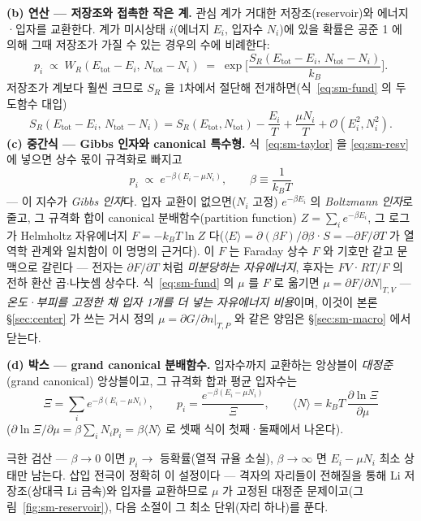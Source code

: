 \textbf{(b) 연산 --- 저장조와 접촉한 작은 계.} 관심 계가 거대한 저장조(reservoir)와 에너지·입자를 교환한다.
계가 미시상태 $i$(에너지 $E_i$, 입자수 $N_i$)에 있을 확률은 공준 1 에 의해 그때 저장조가 가질 수 있는 경우의
수에 비례한다:
\begin{equation}
p_i\;\propto\;W_R(E_\mathrm{tot}-E_i,\,N_\mathrm{tot}-N_i)
\;=\;\exp\!\Big[\frac{S_R(E_\mathrm{tot}-E_i,\,N_\mathrm{tot}-N_i)}{k_B}\Big].
\label{eq:sm-resv}
\end{equation}
저장조가 계보다 훨씬 크므로 $S_R$ 을 1차에서 절단해 전개하면(식~\eqref{eq:sm-fund} 의 두 도함수 대입)
\begin{equation}
S_R(E_\mathrm{tot}-E_i,\,N_\mathrm{tot}-N_i)
= S_R(E_\mathrm{tot},N_\mathrm{tot})-\frac{E_i}{T}+\frac{\mu N_i}{T}+\mathcal O(E_i^2,N_i^2).
\label{eq:sm-taylor}
\end{equation}
\textbf{(c) 중간식 --- Gibbs 인자와 canonical 특수형.} 식~\eqref{eq:sm-taylor} 을 \eqref{eq:sm-resv} 에 넣으면
상수 몫이 규격화로 빠지고
\begin{equation}
p_i\;\propto\;e^{-\beta(E_i-\mu N_i)},\qquad \beta\equiv\frac{1}{k_BT}
\label{eq:sm-gibbsfactor}
\end{equation}
--- 이 지수가 \emph{Gibbs 인자}다. 입자 교환이 없으면($N_i$ 고정) $e^{-\beta E_i}$ 의 \emph{Boltzmann 인자}로
줄고, 그 규격화 합이 canonical 분배함수(partition function) $Z=\sum_ie^{-\beta E_i}$, 그 로그가 Helmholtz
자유에너지 $F=-k_BT\ln Z$ 다($\langle E\rangle=\partial(\beta F)/\partial\beta$·$S=-\partial F/\partial T$ 가
열역학 관계와 일치함이 이 명명의 근거다). 이 $F$ 는 Faraday 상수 $F$ 와 기호만 같고 문맥으로 갈린다 ---
전자는 $\partial F/\partial T$ 처럼 \emph{미분당하는 자유에너지}, 후자는 $FV$·$RT/F$ 의 전하 환산
곱$\cdot$나눗셈 상수다. 식~\eqref{eq:sm-fund} 의 $\mu$ 를 $F$ 로 옮기면
$\mu=\partial F/\partial N|_{T,V}$ --- \emph{온도·부피를 고정한 채 입자 1개를 더 넣는 자유에너지 비용}이며,
이것이 본론 \S\ref{sec:center} 가 쓰는 거시 정의 $\mu=\partial G/\partial n|_{T,P}$ 와 같은 양임은
\S\ref{sec:sm-macro} 에서 닫는다.

\textbf{(d) 박스 --- grand canonical 분배함수.} 입자수까지 교환하는 앙상블이
\emph{대정준}(grand canonical) 앙상블이고, 그 규격화 합과 평균 입자수는
\begin{equation}
\boxed{\;\Xi=\sum_i e^{-\beta(E_i-\mu N_i)},\qquad
p_i=\frac{e^{-\beta(E_i-\mu N_i)}}{\Xi},\qquad
\langle N\rangle=k_BT\,\frac{\partial\ln\Xi}{\partial\mu}\;}
\label{eq:sm-gc}
\end{equation}
($\partial\ln\Xi/\partial\mu=\beta\sum_iN_ip_i=\beta\langle N\rangle$ 로 셋째 식이 첫째·둘째에서 나온다).
\begin{verifybox}
극한 검산 --- $\beta\to0$ 이면 $p_i\to$ 등확률(열적 규율 소실), $\beta\to\infty$ 면 $E_i-\mu N_i$ 최소 상태만
남는다. 삽입 전극이 정확히 이 설정이다 --- 격자의 자리들이 전해질을 통해 Li 저장조(상대극 Li 금속)와 입자를
교환하므로 $\mu$ 가 고정된 대정준 문제이고(그림~\ref{fig:sm-reservoir}), 다음 소절이 그 최소 단위(자리
하나)를 푼다.
\end{verifybox}

